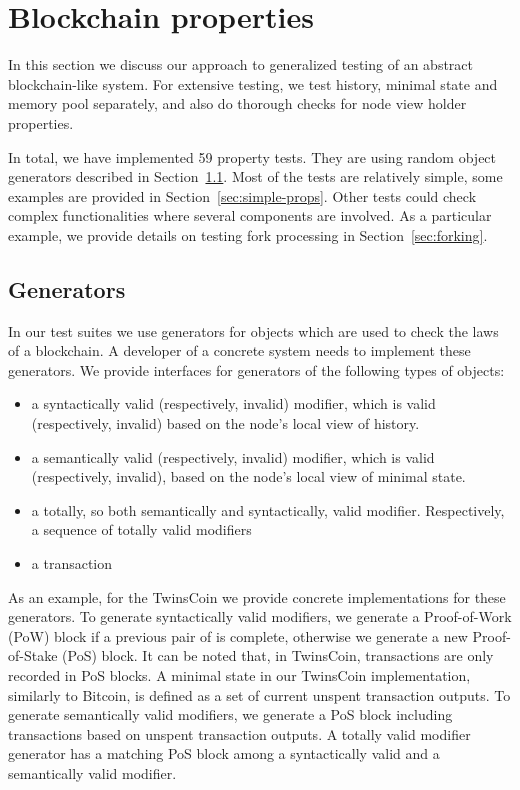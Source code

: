 
\section{Blockchain properties}
\label{sec:props}

In this section we discuss our approach to generalized testing of an abstract blockchain-like system. For extensive testing, we test history, minimal state and memory pool separately, and also do thorough checks for node view holder properties.
	
In total, we have implemented 59 property tests. They are using random object generators described in Section~\ref{sec:generators}. Most of the tests are relatively simple, some examples are provided in Section~\ref{sec:simple-props}. Other tests could check complex functionalities where several components are involved. As a particular example, we provide details on testing fork processing in Section~\ref{sec:forking}.

\subsection{Generators}
\label{sec:generators}

In our test suites we use generators for objects which are used to check the laws of a blockchain. A developer of a concrete system needs to implement these generators. We provide interfaces for generators of the following types of objects:

\begin{itemize}
	\item{a syntactically valid (respectively, invalid) modifier, which is valid (respectively, invalid) based on the node's local view of history.}
	\item{a semantically valid (respectively, invalid) modifier, which is valid (respectively, invalid), based on the node's local view of minimal state.}
	\item{a totally, so both semantically and syntactically, valid modifier. Respectively, a sequence of totally valid modifiers}
	\item{a transaction}
\end{itemize}

As an example, for the TwinsCoin we provide concrete implementations for these generators. To generate syntactically valid modifiers, we generate a Proof-of-Work (PoW) block if a previous pair of {\em<PoW block, PoS block>} is complete, otherwise we generate a new Proof-of-Stake (PoS) block. It can be noted that, in TwinsCoin, transactions are only recorded in PoS blocks. A minimal state in our TwinsCoin implementation, similarly to Bitcoin, is defined as a set of current unspent transaction outputs. To generate semantically valid modifiers, we generate a PoS block including transactions based on unspent transaction outputs. A totally valid modifier generator has a matching PoS block among a syntactically valid and a semantically valid modifier. %

